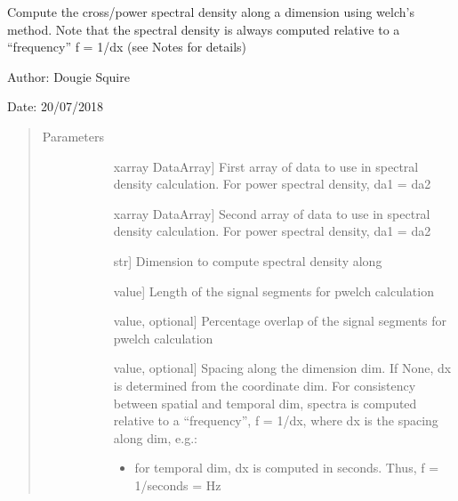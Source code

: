 \documentclass[letterpaper,10pt,english]{sphinxmanual}
\begin{document}

\begin{fulllineitems}
\label{\detokenize{diagnostic_doc:diagnostic.pwelch}}
Compute the cross/power spectral density along a dimension using welch’s method. Note that                 the spectral density is always computed relative to a “frequency” f = 1/dx (see Notes for                 details)

\begin{DUlineblock}{0em}
\item[] Author: Dougie Squire
\item[] Date: 20/07/2018
\end{DUlineblock}
\begin{quote}\begin{description}
\item[{Parameters}] \leavevmode\begin{description}
\item[{}] \leavevmode{[}xarray DataArray{]}
First array of data to use in spectral density calculation. For power spectral density,                     da1 = da2

\item[{}] \leavevmode{[}xarray DataArray{]}
Second array of data to use in spectral density calculation. For power spectral density,                     da1 = da2

\item[{}] \leavevmode{[}str{]}
Dimension to compute spectral density along

\item[{}] \leavevmode{[}value{]}
Length of the signal segments for pwelch calculation

\item[{}] \leavevmode{[}value, optional{]}
Percentage overlap of the signal segments for pwelch calculation

\item[{}] \leavevmode{[}value, optional{]}
Spacing along the dimension dim. If None, dx is determined from the coordinate dim. For                     consistency between spatial and temporal dim, spectra is computed relative to a “frequency”,                     f = 1/dx, where dx is the spacing along dim, e.g.:
\begin{itemize}
\item {} 
for temporal dim, dx is computed in seconds. Thus, f = 1/seconds = Hz


\end{itemize}
\end{description}
\end{description}
\end{quote}
\end{fulllineitems}
\end{document}
